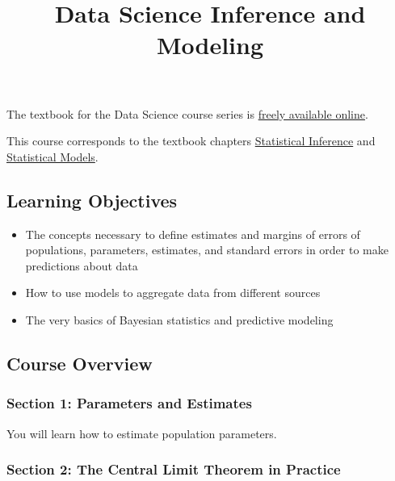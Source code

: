 \documentclass[
]{article}
\title{Data Science Inference and Modeling}
\author{}
\date{\vspace{-2.5em}}
\providecommand{\tightlist}{%
  \setlength{\itemsep}{0pt}\setlength{\parskip}{0pt}}
\begin{document}
\maketitle

The textbook for the Data Science course series is
\href{https://rafalab.github.io/dsbook/}{freely available online}.

This course corresponds to the textbook chapters
\href{https://rafalab.github.io/dsbook/inference.html}{Statistical
Inference} and
\href{https://rafalab.github.io/dsbook/models.html}{Statistical Models}.

\hypertarget{learning-objectives}{%
\subsection{Learning Objectives}\label{learning-objectives}}

\begin{itemize}
\tightlist
\item
  The concepts necessary to define estimates and margins of errors of
  populations, parameters, estimates, and standard errors in order to
  make predictions about data
\item
  How to use models to aggregate data from different sources
\item
  The very basics of Bayesian statistics and predictive modeling
\end{itemize}

\hypertarget{course-overview}{%
\subsection{Course Overview}\label{course-overview}}

\hypertarget{section-1-parameters-and-estimates}{%
\subsubsection{Section 1: Parameters and
Estimates}\label{section-1-parameters-and-estimates}}

You will learn how to estimate population parameters.

\hypertarget{section-2-the-central-limit-theorem-in-practice}{%
\subsubsection{Section 2: The Central Limit Theorem in
Practice}\label{section-2-the-central-limit-theorem-in-practice}}
\end{document}
